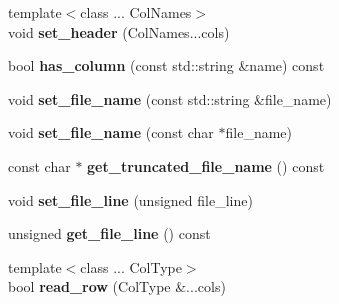\begin{DoxyCompactItemize}
{\footnotesize template$<$class ... Col\+Names$>$ }\\void {\bfseries set\+\_\+header} (Col\+Names...\+cols)
\item 
\mbox{\label{classio_1_1CSVReader_aaba91fff6faea12e451943e8d32a5a17}} 
bool {\bfseries has\+\_\+column} (const std\+::string \&name) const
\item 
\mbox{\label{classio_1_1CSVReader_a4096c1e43a4fba2b4f5ae21d047b5fbc}} 
void {\bfseries set\+\_\+file\+\_\+name} (const std\+::string \&file\+\_\+name)
\item 
\mbox{\label{classio_1_1CSVReader_a5f1dc083a8fa8661f5ecdcf6aebc7b24}} 
void {\bfseries set\+\_\+file\+\_\+name} (const char $\ast$file\+\_\+name)
\item 
\mbox{\label{classio_1_1CSVReader_abc6321895152f5a34959b499da6512ee}} 
const char $\ast$ {\bfseries get\+\_\+truncated\+\_\+file\+\_\+name} () const
\item 
\mbox{\label{classio_1_1CSVReader_a1303bd6a2eb0d3d7c743212e52839ac4}} 
void {\bfseries set\+\_\+file\+\_\+line} (unsigned file\+\_\+line)
\item 
\mbox{\label{classio_1_1CSVReader_a065f805596018d1568b81152e6a22e0c}} 
unsigned {\bfseries get\+\_\+file\+\_\+line} () const
\item 
\mbox{\label{classio_1_1CSVReader_a61ecdcaa62c024bf97c4e5d133478d7e}} 
{\footnotesize template$<$class ... Col\+Type$>$ }\\bool {\bfseries read\+\_\+row} (Col\+Type \&...cols)
\end{DoxyCompactItemize}
